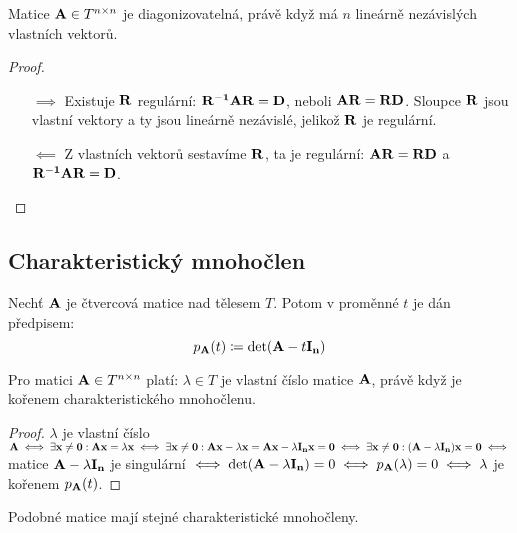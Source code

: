 \begin{theorem}
    Matice $\mathbf{A} \in T^{n \times n}$ je diagonizovatelná, právě když
    má $n$ lineárně nezávislých vlastních vektorů.
\end{theorem}

\begin{proof}
    \leavevmode
    \begin{itemize}
        \item[$\implies$] Existuje $\mathbf{R}$ regulární: $\mathbf{R^{-1}} \mathbf{A} \mathbf{R} = \mathbf{D}$,
            neboli $\mathbf{A} \mathbf{R} = \mathbf{R} \mathbf{D}$. Sloupce $\mathbf{R}$ jsou vlastní vektory a
            ty jsou lineárně nezávislé, jelikož $\mathbf{R}$ je regulární.
        \item[$\impliedby$] Z vlastních vektorů sestavíme $\mathbf{R}$, ta je 
            regulární: $\mathbf{A} \mathbf{R} = \mathbf{R} \mathbf{D}$ a $\mathbf{R^{-1}} \mathbf{A} \mathbf{R} = \mathbf{D}$.
    \end{itemize}
\end{proof}

\subsection{Charakteristický mnohočlen}

\begin{definition}
    Nechť $\mathbf{A}$ je čtvercová matice nad tělesem $T$. Potom 
     v proměnné $t$ je dán
    předpisem:
    $$p_{\mathbf{A}}(t) \coloneqq \det(\mathbf{A} - t\mathbf{I_{n}})$$
\end{definition}

\begin{theorem}
    Pro matici $\mathbf{A} \in T^{n \times n}$ platí: $\lambda \in T$ je vlastní
    číslo matice $\mathbf{A}$, právě když je kořenem charakteristického 
    mnohočlenu.
\end{theorem}

\begin{proof}
    $\lambda$ je vlastní číslo $\mathbf{A} \iff \exists \mathbf{x} \neq \mathbf{0}: \mathbf{A}\mathbf{x}
    = \lambda\mathbf{x} \iff \exists \mathbf{x} \neq \mathbf{0}: \mathbf{A}\mathbf{x} - \lambda\mathbf{x} =
    \mathbf{A} \mathbf{x} - \lambda \mathbf{I_{n}} \mathbf{x} = \mathbf{0} \iff \exists \mathbf{x} \neq \mathbf{0}:
    (\mathbf{A} - \lambda\mathbf{I_{n}}) \mathbf{x} = \mathbf{0} \iff$ matice $\mathbf{A} - \lambda\mathbf{I_{n}}$ 
    je singulární $\iff \det(\mathbf{A} - \lambda \mathbf{I_{n}}) = 0 \iff 
    p_{\mathbf{A}}(\lambda) = 0 \iff \lambda$ je kořenem $p_{\mathbf{A}}(t)$.
\end{proof}

\begin{proposition}
    Podobné matice mají stejné charakteristické mnohočleny.
\end{proposition}


